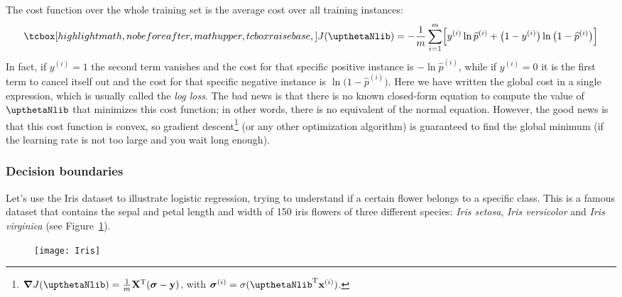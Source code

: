 The cost function over the whole training set is the average cost over all training instances:
\begin{equation}\label{log_loss}
\tcbhighmath{J(\boldtheta)=-\frac{1}{m}\sum_{i=1}^m\Bigl[y^{(i)}\ln{\widehat{p}^{(i)}}+\bigl(1-y^{(i)}\bigr)\ln{\bigl(1-\widehat{p}^{(i)}\bigr)}\Bigr]}
\end{equation}
In fact, if $y^{(i)}=1$ the second term vanishes and the cost for that specific positive instance is $-\ln{\widehat{p}^{(i)}}$, while if $y^{(i)}=0$ it is the first term to cancel itself out and the cost for that specific negative instance is $\ln{\bigl(1-\widehat{p}^{(i)}\bigr)}$. Here we have written the global cost in a single expression, which is usually called the \emph{log loss}. The bad news is that there is no known closed-form equation to compute the value of $\boldtheta$ that minimizes this cost function; in other words, there is no equivalent of the normal equation. However, the good news is that this cost function is convex, so gradient descent\footnote{$\boldsymbol{\nabla}J(\boldtheta)=\frac{1}{m}\mathbf{X}^{\mathrm{T}}(\boldsigma-\mathbf{y})$, with $\boldsigma^{(i)}=\sigma(\boldtheta^{\mathrm{T}}\mathbf{x}^{(i)})$.} (or any other optimization algorithm) is guaranteed to find the global minimum (if the learning rate is not too large and you wait long enough).
\subsubsection{Decision boundaries}
Let's use the Iris dataset to illustrate logistic regression, trying to understand if a certain flower belongs to a specific class. This is a famous dataset that contains the sepal and petal length and width of 150 iris flowers of three different species: \emph{Iris setosa}, \emph{Iris versicolor} and \emph{Iris virginica} (see Figure~\ref{Iris}).
\begin{figure}[h!t]
\centering
\texttt{[image: Iris]}
\caption{}\label{Iris}
\end{figure}

